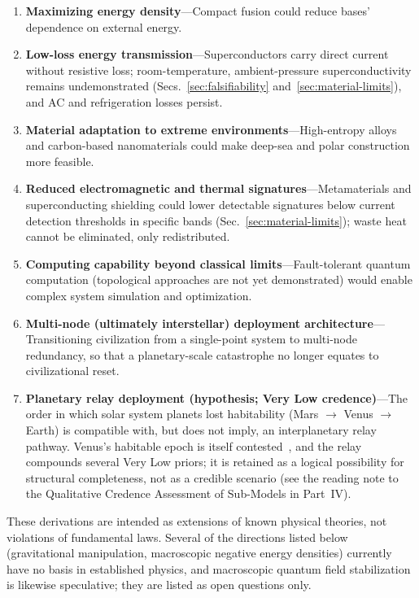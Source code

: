 \documentclass[aps,prd,twocolumn,superscriptaddress,nofootinbib]{revtex4-2}
\begin{document}
\begin{enumerate}
  \item \textbf{Maximizing energy density}---Compact fusion could reduce bases' dependence on external energy.
  \item \textbf{Low-loss energy transmission}---Superconductors carry direct current without resistive loss; room-temperature, ambient-pressure superconductivity remains undemonstrated (Secs.~\ref{sec:falsifiability} and~\ref{sec:material-limits}), and AC and refrigeration losses persist.
  \item \textbf{Material adaptation to extreme environments}---High-entropy alloys and carbon-based nanomaterials could make deep-sea and polar construction more feasible.
  \item \textbf{Reduced electromagnetic and thermal signatures}---Metamaterials and superconducting shielding could lower detectable signatures below current detection thresholds in specific bands (Sec.~\ref{sec:material-limits}); waste heat cannot be eliminated, only redistributed.
  \item \textbf{Computing capability beyond classical limits}---Fault-tolerant quantum computation (topological approaches are not yet demonstrated) would enable complex system simulation and optimization.
  \item \textbf{Multi-node (ultimately interstellar) deployment architecture}---Transitioning civilization from a single-point system to multi-node redundancy, so that a planetary-scale catastrophe no longer equates to civilizational reset.
  \item \textbf{Planetary relay deployment (hypothesis; Very Low credence)}---The order in which solar system planets lost habitability (Mars $\to$ Venus $\to$ Earth) is compatible with, but does not imply, an interplanetary relay pathway. Venus's habitable epoch is itself contested~\cite{Constantinou2024,Turbet2021,Warren2023}, and the relay compounds several Very Low priors; it is retained as a logical possibility for structural completeness, not as a credible scenario (see the reading note to the Qualitative Credence Assessment of Sub-Models in Part~IV).
\end{enumerate}

These derivations are intended as extensions of known physical theories, not violations of fundamental laws. Several of the directions listed below (gravitational manipulation, macroscopic negative energy densities) currently have no basis in established physics, and macroscopic quantum field stabilization is likewise speculative; they are listed as open questions only.
\end{document}
